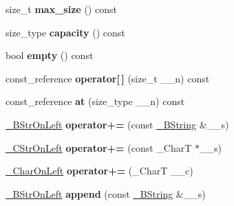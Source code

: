 \begin{DoxyCompactItemize}
\item 
\mbox{\label{class____bstr__sum_a7aa53d1659c1fa91240afd428e89c25b}} 
size\+\_\+t {\bfseries max\+\_\+size} () const
\item 
\mbox{\label{class____bstr__sum_a2ede1a33a0bc0553cbe006e9e33a4eab}} 
size\+\_\+type {\bfseries capacity} () const
\item 
\mbox{\label{class____bstr__sum_a15736a81d66468604bab2f51c7cb6328}} 
bool {\bfseries empty} () const
\item 
\mbox{\label{class____bstr__sum_ab06a4604db562cb0af5a7be96ea100ef}} 
const\+\_\+reference {\bfseries operator\mbox{[}$\,$\mbox{]}} (size\+\_\+t \+\_\+\+\_\+n) const
\item 
\mbox{\label{class____bstr__sum_a72ea9654540f0ea2a8f8277fae709ab4}} 
const\+\_\+reference {\bfseries at} (size\+\_\+type \+\_\+\+\_\+n) const
\item 
\mbox{\label{class____bstr__sum_a419b418082ebe0dfa16ae0c1a1e50b23}} 
\hyperlink{class____bstr__sum}{\+\_\+\+B\+Str\+On\+Left} {\bfseries operator+=} (const \hyperlink{classbasic__string}{\+\_\+\+B\+String} \&\+\_\+\+\_\+s)
\item 
\mbox{\label{class____bstr__sum_a479ed851ffcb9e72e390470b7e207e1c}} 
\hyperlink{class____bstr__sum}{\+\_\+\+C\+Str\+On\+Left} {\bfseries operator+=} (const \+\_\+\+CharT $\ast$\+\_\+\+\_\+s)
\item 
\mbox{\label{class____bstr__sum_a5fa4e563ff9dd327694f710a7b2beff7}} 
\hyperlink{class____bstr__sum}{\+\_\+\+Char\+On\+Left} {\bfseries operator+=} (\+\_\+\+CharT \+\_\+\+\_\+c)
\item 
\mbox{\label{class____bstr__sum_af500de9586a5a16d5f7375be2c72e8a5}} 
\hyperlink{class____bstr__sum}{\+\_\+\+B\+Str\+On\+Left} {\bfseries append} (const \hyperlink{classbasic__string}{\+\_\+\+B\+String} \&\+\_\+\+\_\+s)
\item 
\mbox{\label{class____bstr__sum_abc0d12cc10647f34a9a59440f6fb0a0b}} 

\end{DoxyCompactItemize}
